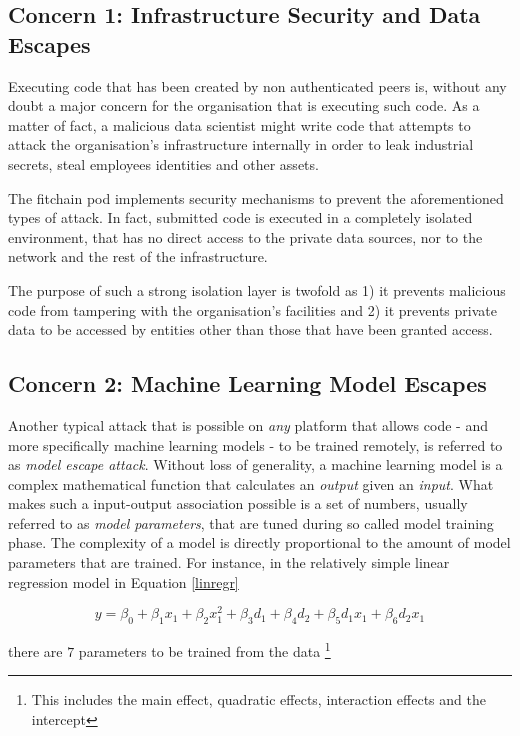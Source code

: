\documentclass[12pt, a4paper,titlepage]{extreport}
\begin{document}
\subsection{Concern 1: Infrastructure Security and Data Escapes}
Executing code that has been created by non authenticated peers is, without any doubt a major concern for the organisation that is executing such code. 
As a matter of fact, a malicious data scientist might write code that attempts to attack the organisation's infrastructure internally in order to leak industrial secrets, steal employees identities and other assets.

The fitchain pod implements security mechanisms to prevent the aforementioned types of attack. In fact, submitted code is executed in a completely isolated environment, that has no direct access to the private data sources, nor to the network and the rest of the infrastructure.

The purpose of such a strong isolation layer is twofold as 1) it prevents malicious code from tampering with the organisation's facilities and 2) it prevents private data to be accessed by entities other than those that have been granted access.


\subsection{Concern 2: Machine Learning Model Escapes}
Another typical attack that is possible on \textit{any} platform that allows code - and more specifically machine learning models - to be trained remotely, is referred to as \textit{model escape attack}. 
Without loss of generality, a machine learning model is a complex mathematical function that calculates an \textit{output} given an \textit{input}. What makes such a input-output association possible is a set of numbers, usually referred to as \textit{model parameters}, that are tuned during so called model training phase. 
The complexity of a model is directly proportional to the amount of model parameters that are trained. For instance, in the relatively simple linear regression model in Equation \ref{linregr}

 \begin{equation}\label{linregr}
 y=\beta_0+\beta_1 x_1 + \beta_2 x_1^2 + \beta_3 d_1 + \beta_4 d_2 + \beta_5 d_1 x_1+ \beta_6 d_2 x_1  
 \end{equation}
 
there are $7$ parameters to be trained from the data \footnote{This includes the main effect, quadratic effects, interaction effects and the intercept}
 
\end{document}

